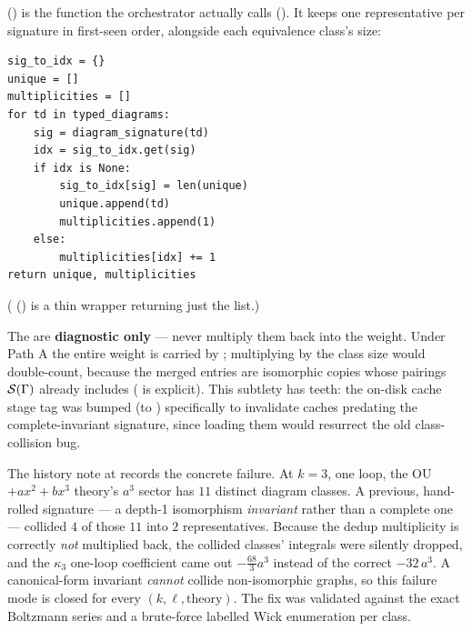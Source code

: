 () is the function the orchestrator actually calls
(). It keeps one representative per signature in
first-seen order, alongside each equivalence class's size:

\begin{lstlisting}
sig_to_idx = {}
unique = []
multiplicities = []
for td in typed_diagrams:
    sig = diagram_signature(td)
    idx = sig_to_idx.get(sig)
    if idx is None:
        sig_to_idx[sig] = len(unique)
        unique.append(td)
        multiplicities.append(1)
    else:
        multiplicities[idx] += 1
return unique, multiplicities
\end{lstlisting}

( () is a thin
wrapper returning just the  list.)

\begin{gotcha}
The  are \textbf{diagnostic only} --- never multiply them
back into the weight. Under Path A the entire weight is carried by
; multiplying by the class size would double-count,
because the merged entries are isomorphic copies whose pairings $\mathcal{S}(\Gamma)$
already includes ( is explicit). This subtlety has
teeth: the on-disk cache stage tag was bumped (to )
specifically to invalidate caches predating the complete-invariant signature,
since loading them would resurrect the old class-collision bug.
\end{gotcha}

\begin{example}
The history note at  records the concrete failure. At
$k=3$, one loop, the OU$+ax^2+bx^3$ theory's $a^3$ sector has $11$ distinct
diagram classes. A previous, hand-rolled signature --- a depth-1 isomorphism
\emph{invariant} rather than a complete one --- collided $4$ of those $11$ into
$2$ representatives. Because the dedup multiplicity is correctly \emph{not}
multiplied back, the collided classes' integrals were silently dropped, and the
$\kappa_3$ one-loop coefficient came out $-\tfrac{68}{3}a^3$ instead of the
correct $-32\,a^3$. A canonical-form invariant \emph{cannot} collide
non-isomorphic graphs, so this failure mode is closed for every $(k, \ell,
\text{theory})$. The fix was validated against the exact Boltzmann series and a
brute-force labelled Wick enumeration per class.
\end{example}

